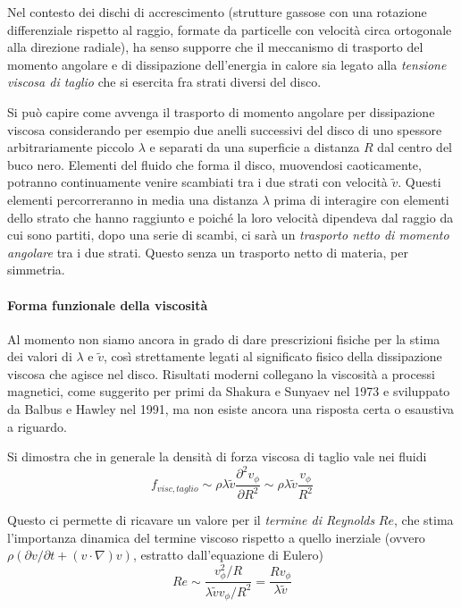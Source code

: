 \documentclass[a4paperbi]{article}
\begin{document}
	Nel contesto dei dischi di accrescimento (strutture gassose con una rotazione differenziale rispetto al raggio, formate da particelle con velocità circa ortogonale alla direzione radiale), ha senso supporre che il meccanismo di trasporto del momento angolare e di dissipazione dell'energia in calore sia legato alla \textit{tensione viscosa di taglio} che si esercita fra strati diversi del disco.	

	Si può capire come avvenga il trasporto di momento angolare per dissipazione viscosa considerando per esempio due anelli successivi del disco di uno spessore arbitrariamente piccolo $\lambda$ e separati da una superficie a distanza $R$ dal centro del buco nero. Elementi del fluido che forma il disco, muovendosi caoticamente, potranno continuamente venire scambiati tra i due strati con velocità $\tilde{v}$. Questi elementi percorreranno in media una distanza $\lambda$ prima di interagire con elementi dello strato che hanno raggiunto e poiché la loro velocità dipendeva dal raggio da cui sono partiti, dopo una serie di scambi, ci sarà un \textit{trasporto netto di momento angolare} tra i due strati. Questo senza un trasporto netto di materia, per simmetria.

	\paragraph{Forma funzionale della viscosità}	
	Al momento non siamo ancora in grado di dare prescrizioni fisiche per la stima dei valori di $\lambda$ e $\tilde{v}$, così strettamente legati al significato fisico della dissipazione viscosa che agisce nel disco. Risultati moderni collegano la viscosità a processi magnetici, come suggerito per primi da Shakura e Sunyaev nel 1973 e sviluppato da Balbus e Hawley nel 1991, ma non esiste ancora una risposta certa o esaustiva a riguardo. 
	
	Si dimostra che in generale la densità di forza viscosa di taglio vale nei fluidi
	\begin{equation}
		f_{visc,taglio}\sim\rho\lambda\tilde{v}\frac{\partial^2v_\phi}{\partial R^2}\sim\rho\lambda\tilde{v}\frac{v_\phi}{R^2}
	\end{equation}

	Questo ci permette di ricavare un valore per il \textit{termine di Reynolds} $Re$, che stima l'importanza dinamica del termine viscoso rispetto a quello inerziale (ovvero $\rho(\partial\textit{v}/\partial t+(\textit{v}\cdot\nabla)\textit{v})$, estratto dall'equazione di Eulero)
	\begin{equation}
		Re\sim\frac{v_\phi^2/R}{\lambda\tilde{v}v_\phi/R^2}=\frac{Rv_\phi}{\lambda\tilde{v}}
	\end{equation}
	
\end{document}

